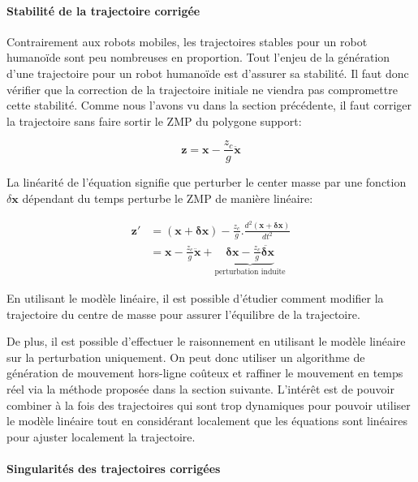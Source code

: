 \paragraph{Stabilité de la trajectoire corrigée}


Contrairement aux robots mobiles, les trajectoires stables pour un
robot humanoïde sont peu nombreuses en proportion. Tout l'enjeu de la
génération d'une trajectoire pour un robot humanoïde est d'assurer sa
stabilité. Il faut donc vérifier que la correction de la trajectoire
initiale ne viendra pas compromettre cette stabilité. Comme nous
l'avons vu dans la section précédente, il faut corriger la trajectoire
sans faire sortir le ZMP du polygone support:

\begin{equation} \label{eq:zmp2}
  \mathbf{z} = \mathbf{x}  - \frac{z_c}{g} \ddot{\mathbf{x}}
\end{equation}

La linéarité de l'équation signifie que perturber le center masse par
une fonction \mbox{$\delta \mathbf{x}$} dépendant du temps perturbe le
ZMP de manière linéaire:

\begin{equation} \label{eq:zmpperturbation}
\begin{split}
  \mathbf{z'} &= (\mathbf{x} + \mathbf{\delta x}) - \frac{z_c}{g} .
  \frac{d^2 (\mathbf{x} + \mathbf{\delta x})}{d t^2}\\
  &= \mathbf{x} - \frac{z_c}{g} \ddot{\mathbf{x}} +
  \underbrace{\mathbf{\delta x} - \frac{z_c}{g} \ddot{\mathbf{\delta
        x}}}_{\text{perturbation induite}}
\end{split}
\end{equation}

En utilisant le modèle linéaire, il est possible d'étudier comment
modifier la trajectoire du centre de masse pour assurer l'équilibre de
la trajectoire.

De plus, il est possible d'effectuer le raisonnement en utilisant le
modèle linéaire sur la perturbation uniquement. On peut donc utiliser
un algorithme de génération de mouvement hors-ligne coûteux et
raffiner le mouvement en temps réel via la méthode proposée dans la
section suivante. L'intérêt est de pouvoir combiner à la fois des
trajectoires qui sont trop dynamiques pour pouvoir utiliser le modèle
linéaire tout en considérant localement que les équations sont
linéaires pour ajuster localement la trajectoire.


\paragraph{Singularités des trajectoires corrigées}


